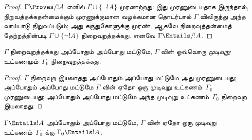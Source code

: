 \documentclass[../../../include/open-logic-section]{subfiles}
\begin{document}
\begin{proof}
$\Gamma\Proves/ !A$ எனில்
$\Gamma \cup \{\lnot !A\}$ முரணற்றது:
இது முரணுடையதாக இருந்தால், நிறுவத்தக்கதன்மைக்கும்
முரணுக்குமான வழக்கமான தொடர்பால் $\Gamma$ விலிருந்து
அந்த வாய்பாடு நிறுவப்படும்; அது கருதுகோளுக்கு முரண்.
ஆகவே நிறைவுத்தன்மைத் தேற்றத்தின்படி
$\Gamma \cup \{\lnot !A\}$ நிறைவுறத்தக்கது.
எனவே $\Gamma \Entails/ !A$.
\end{proof}

\begin{prop}[இறுக்கத்தன்மைத் தேற்றம்]
$\Gamma$ நிறைவுறத்தக்கது அப்போதும் அப்போது
மட்டுமே, $\Gamma$ வின் ஒவ்வொரு
\emph{முடிவுறு} உட்கணமும்~$\Gamma_0$
நிறைவுறத்தக்கது.
\end{prop}

\begin{proof}
$\Gamma$ நிறைவுற இயலாதது அப்போதும் அப்போது
மட்டுமே அது முரணுடையது; அப்போதும் அப்போது
மட்டுமே $\Gamma$ வின் ஏதோ ஒரு முடிவுறு
உட்கணம்~$\Gamma_0$ முரணுடையது; அப்போதும்
அப்போது மட்டுமே அந்த முடிவுறு
உட்கணம்~$\Gamma_0$ நிறைவுற இயலாதது.
\end{proof}

\begin{cor}
$\Gamma \Entails !A$ அப்போதும் அப்போது
மட்டுமே, $\Gamma$ வின் ஏதோ ஒரு முடிவுறு
உட்கணம்~$\Gamma_0$ க்கு
$\Gamma_0 \Entails !A$.
\end{cor}
\end{document}
